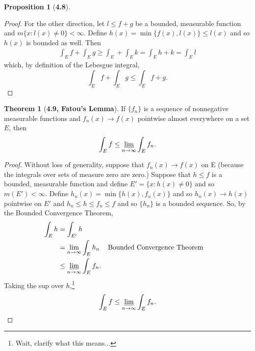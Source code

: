 \documentclass[12pt]{article}
\theoremstyle{definition}
\newtheorem*{thm}{Theorem}
\newtheorem*{prop}{Proposition}
\begin{document}
\begin{prop}[\textbf{4.8}]
\begin{proof}
      For the other direction, let \( l \leq f + g \) be a bounded, measurable function and \( m\{ x: l(x) \neq 0 \} < \infty \). 
      Define \( \displaystyle h(x) = \min\{ f(x), l(x)\} \leq l(x) \) and so \( h(x) \) is bounded as well. Then
        \begin{align*}
          \int_{E} f + \int_{E} g \geq \int_{E} + \int_{E} k = \int_{E} h + k = \int_{E} l
        \end{align*}
      which, by definition of the Lebesgue integral, 
        \[
          \int_{E} f + \int_{E} g  \leq \int_{E} f + g.
        \]
    \end{proof}

\end{prop}

\begin{thm}[\textbf{4.9, Fatou's Lemma}]

  If \( \{f_n\} \) is a sequence of nonnegative measurable functions and \( f_n(x) \to f(x) \) pointwise almost everywhere on a set \( E \), then 
    \[
        \int_{E} f \leq \varliminf_{n \to \infty} \int_{E} f_n.
    \]
  \begin{proof}
    Without loss of generality, suppose that \( f_n(x) \to f(x) \) on E (because the integrals over sets of measure zero are zero.) 
    Suppose that \( h \leq f \) is a bounded, measurable function and define \( E' = \{ x: h(x) \neq 0 \} \) and so \( m(E') < \infty \). 
    Define \( h_n(x) = \min \{ h(x), f_n(x)\}\) and so \( h_n(x) \to h(x) \) pointwise on \( E' \) and \( h_n \leq h \leq f_n \leq f \) and so \( \{h_n\} \) is a bounded sequence. So, by the Bounded Convergence Theorem,
      \begin{align*}
        \int_{E} h &= \int_{E'} h \\
         &= \lim_{n \to \infty} \int_{E} h_n && \text{Bounded Convergence Theorem} \\
         &\leq \varliminf_{n \to \infty} \int_{E} f_n.
      \end{align*}
    Taking the sup over \( h \),\footnote{Wait, clarify what this means...}
      \[
          \int_{E} f \leq \varliminf_{n \to \infty} \int_{E} f_n.
      \]

  \end{proof}

\end{thm}
\end{document}
